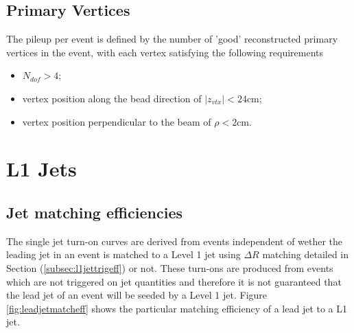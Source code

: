 \section{Primary Vertices}

\label{app:primaryvertices}

The pileup per event is defined by the number of 'good' reconstructed primary vertices in the event, with each vertex satisfying the following requirements

\begin{itemize}
	\item $N_{dof} > 4$;
	\item vertex position along the bead direction of $\vert z_{vtx} \vert < 24$cm; 
	\item vertex position perpendicular to the beam of $\rho < 2$cm.

\end{itemize}


\chapter{L1 Jets}

\section{Jet matching efficiencies}
\label{app:jetmatching}

The single jet turn-on curves are derived from events independent of wether the leading jet in an event is matched to a Level 1 jet using $\Delta R$ matching detailed in Section  (\ref{subsec:l1jettrigeff}) or not.  These turn-ons are produced from events which are not triggered on jet quantities and therefore it is not guaranteed that the lead jet of an event will be seeded by a Level 1 jet. Figure \ref{fig:leadjetmatcheff} shows the particular matching efficiency of a lead jet to a L1 jet.

